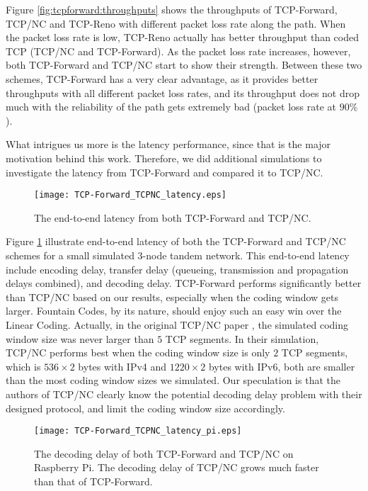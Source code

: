 \documentclass[10pt, conference, final, letterpaper]{IEEEtran}
\theoremstyle{definition}
\begin{document}
Figure \ref{fig:tcpforward:throughputs} shows the throughputs of TCP-Forward, TCP/NC and TCP-Reno with different packet loss rate along the path. When the packet loss rate is low, TCP-Reno actually has better throughput than coded TCP (TCP/NC and TCP-Forward). As the packet loss rate increases, however, both TCP-Forward and TCP/NC start to show their strength. Between these two schemes, TCP-Forward has a very clear advantage, as it provides better throughputs with all different packet loss rates, and its throughput does not drop much with the reliability of the path gets extremely bad (packet loss rate at $90\%$).

What intrigues us more is the latency performance, since that is the major motivation behind this work. Therefore, we did additional simulations to investigate the latency from TCP-Forward and compared it to TCP/NC.

\begin{figure}[htb]
	\begin{center}
		\texttt{[image: TCP-Forward\_TCPNC\_latency.eps]}
	\end{center}
	\caption{The end-to-end latency from both TCP-Forward and TCP/NC.}
	\label{fig:tcpforward:tcpnc}
\end{figure}

Figure \ref{fig:tcpforward:tcpnc} illustrate end-to-end latency of both the TCP-Forward and TCP/NC schemes for a small simulated 3-node tandem network. This end-to-end latency include encoding delay, transfer delay (queueing, transmission and propagation delays combined), and decoding delay. TCP-Forward performs significantly better than TCP/NC based on our results, especially when the coding window gets larger. Fountain Codes, by its nature, should enjoy such an easy win over the Linear Coding. Actually, in the original TCP/NC paper \cite{TCPNC}, the simulated coding window size was never larger than $5$ TCP segments. In their simulation, TCP/NC performs best when the coding window size is only $2$ TCP segments, which is $536 \times 2$ bytes with IPv4 and $1220 \times 2$ bytes with IPv6, both are smaller than the most coding window sizes we simulated. Our speculation is that the authors of TCP/NC clearly know the potential decoding delay problem with their designed protocol, and limit the coding window size accordingly.

\begin{figure}[thb]
	\begin{center}
		\texttt{[image: TCP-Forward\_TCPNC\_latency\_pi.eps]}
	\end{center}
	\caption{The decoding delay of both TCP-Forward and TCP/NC on Raspberry Pi. The decoding delay of TCP/NC grows much faster than that of TCP-Forward.}
	\label{fig:tcpforward:tcpnc:pi}
\end{figure}
\end{document}
